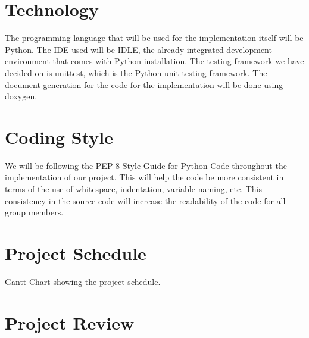 \documentclass[12pt]{article}
\begin{document}
\section{Technology}

\tab The programming language that will be used for the implementation itself will be Python. The IDE used will be IDLE, the already integrated development environment that comes with Python installation. The testing framework we have decided on is unittest, which is the Python unit testing framework. The document generation for the code for the implementation will be done using doxygen. 

\section{Coding Style}

\tab We will be following the PEP 8 Style Guide for Python Code throughout the implementation of our project. This will help the code be more consistent in terms of the use of whitespace, indentation, variable naming, etc. This consistency in the source code will increase the readability of the code for all group members.

\section{Project Schedule}

   \href{3XA3 Gantt Chart.pdf}{Gantt Chart showing the project schedule.}

\section{Project Review}
\end{document}
